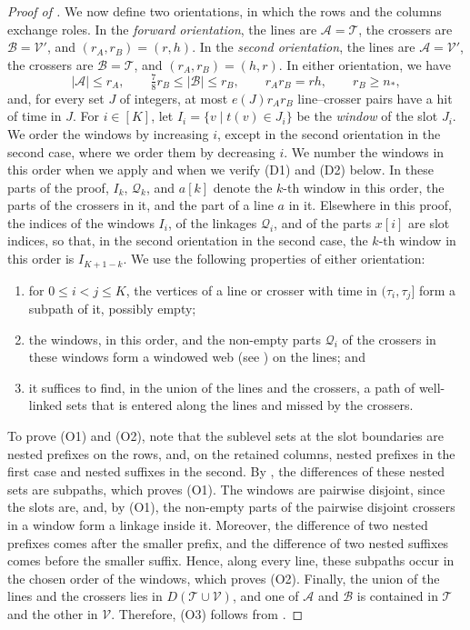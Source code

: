 \documentclass[fontsize=12pt,leading=14pt]{fullpaper}
\newcommand{\Acal}{\mathcal{A}}
\newcommand{\Bcal}{\mathcal{B}}
\newcommand{\Qcal}{\mathcal{Q}}
\newcommand{\Tcal}{\mathcal{T}}
\newcommand{\Vcal}{\mathcal{V}}
\begin{document}
\begin{proof}[Proof of ]
  We now define two orientations, in which the rows and the columns exchange roles.
  In the \emph{forward orientation}, the lines are $\Acal=\Tcal$, the crossers are $\Bcal=\Vcal'$, and $(r_A,r_B)=(r,h)$.
  In the \emph{second orientation}, the lines are $\Acal=\Vcal'$, the crossers are $\Bcal=\Tcal$, and $(r_A,r_B)=(h,r)$.
  In either orientation, we have
  \[
    |\Acal|\le r_A,\qquad \tfrac78r_B\le|\Bcal|\le r_B,\qquad
    r_Ar_B=rh,\qquad r_B\ge n_*,
  \]
  and, for every set $J$ of integers, at most $e(J)r_Ar_B$ line--crosser pairs have a hit of time in $J$.
  For $i\in[K]$, let $I_i=\{v\mid t(v)\in J_i\}$ be the \emph{window} of the slot $J_i$.
  We order the windows by increasing $i$, except in the second orientation in the second case, where we order them by decreasing $i$.
  We number the windows in this order when we apply  and when we verify (D1) and (D2) below.
  In these parts of the proof, $I_k$, $\Qcal_k$, and $a[k]$ denote the $k$-th window in this order, the parts of the crossers in it, and the part of a line $a$ in it.
  Elsewhere in this proof, the indices of the windows $I_i$, of the linkages $\Qcal_i$, and of the parts $x[i]$ are slot indices, so that, in the second orientation in the second case, the $k$-th window in this order is $I_{K+1-k}$.
  We use the following properties of either orientation:
  \begin{enumerate}[label=\textnormal{(O\arabic*)}]
    \item for $0\le i<j\le K$, the vertices of a line or crosser with time in $(\tau_i,\tau_j]$ form a subpath of it, possibly empty;
    \item the windows, in this order, and the non-empty parts $\Qcal_i$ of the crossers in these windows form a windowed web (see ) on the lines; and
    \item it suffices to find, in the union of the lines and the crossers, a path of well-linked sets that is entered along the lines and missed by the crossers.
  \end{enumerate}
  To prove (O1) and (O2), note that the sublevel sets at the slot boundaries are nested prefixes on the rows, and, on the retained columns, nested prefixes in the first case and nested suffixes in the second.
  By , the differences of these nested sets are subpaths, which proves (O1).
  The windows are pairwise disjoint, since the slots are, and, by (O1), the non-empty parts of the pairwise disjoint crossers in a window form a linkage inside it.
  Moreover, the difference of two nested prefixes comes after the smaller prefix, and the difference of two nested suffixes comes before the smaller suffix.
  Hence, along every line, these subpaths occur in the chosen order of the windows, which proves (O2).
  Finally, the union of the lines and the crossers lies in $D(\Tcal\cup\Vcal)$, and one of $\Acal$ and $\Bcal$ is contained in $\Tcal$ and the other in $\Vcal$.
  Therefore, (O3) follows from .


\end{proof}
\end{document}

